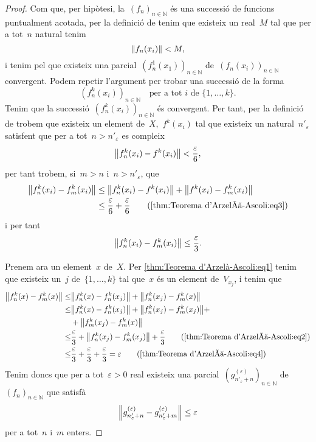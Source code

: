 \documentclass[../../Main.tex]{subfiles}
\begin{document}
\begin{lemma}
\begin{proof}
			Com que, per hipòtesi, la~\((f_{n})_{n\in\mathbb{N}}\) és una successió de funcions puntualment acotada, per la definició de  tenim que existeix un real~\(M\) tal que per a tot~\(n\) natural tenim
			\[
			    \norm{f_{n}(x_{i})}<M,
			\]
			i tenim pel  que existeix una parcial~\((f_{n}^{1}(x_{1}))_{n\in\mathbb{N}}\) de~\((f_{n}(x_{i}))_{n\in\mathbb{N}}\) convergent.
			Podem repetir l'argument per trobar una successió de la forma
			\[
			    (f^{k}_{n}(x_{i}))_{n\in\mathbb{N}}\quad\text{per a tot }i\text{ de }\{1,\dots,k\}.
			\]
			Tenim que la successió~\((f^{k}_{n}(x_{i}))_{n\in\mathbb{N}}\) és convergent.
			Per tant, per la definició de  trobem que existeix un element de~\(X\),~\(f^{k}(x_{i})\) tal que existeix un natural~\(n'_{\varepsilon}\) satisfent que per a tot~\(n>n'_{\varepsilon}\) es compleix
			\begin{equation}
				\label{thm:Teorema d'Arzelà-Ascoli:eq3}
				\norm{f^{k}_{n}(x_{i})-f^{k}(x_{i})}<\frac{\varepsilon}{6},
			\end{equation}
			per tant trobem, si~\(m>n\) i~\(n>n'_{\varepsilon}\), que
			\begin{align*}
				\norm{f^{k}_{n}(x_{i})-f^{k}_{m}(x_{i})}&\leq\norm{f^{k}_{n}(x_{i})-f^{k}(x_{i})}+\norm{f^{k}(x_{i})-f^{k}_{m}(x_{i})} \\
				&\leq\frac{\varepsilon}{6}+\frac{\varepsilon}{6} \tag{\ref{thm:Teorema d'Arzelà-Ascoli:eq3}}
			\end{align*}
			i per tant
			\begin{equation}
				\label{thm:Teorema d'Arzelà-Ascoli:eq4}
				\norm{f^{k}_{n}(x_{i})-f^{k}_{m}(x_{i})}\leq\frac{\varepsilon}{3}.
			\end{equation}

			Prenem ara un element~\(x\) de~\(X\).
			Per \eqref{thm:Teorema d'Arzelà-Ascoli:eq1} tenim que existeix un~\(j\) de~\(\{1,\dots,k\}\) tal que~\(x\) és un element de~\(V_{x_{j}}\), i tenim que
			\begin{align*}
				\norm{f^{k}_{n}(x)-f^{k}_{m}(x)}\leq&\norm{f^{k}_{n}(x)-f^{k}_{n}(x_{j})}+\norm{f^{k}_{n}(x_{j})-f^{k}_{m}(x)} \\
				\leq&\norm{f^{k}_{n}(x)-f^{k}_{n}(x_{j})}+\norm{f^{k}_{n}(x_{j})-f^{k}_{m}(x_{j})}+\\&+\norm{f^{k}_{m}(x_{j})-f^{k}_{m}(x)} \\
				\leq&\frac{\varepsilon}{3}+\norm{f^{k}_{n}(x_{j})-f^{k}_{m}(x_{j})}+\frac{\varepsilon}{3}\tag{\ref{thm:Teorema d'Arzelà-Ascoli:eq2}} \\
				\leq&\frac{\varepsilon}{3}+\frac{\varepsilon}{3}+\frac{\varepsilon}{3}=\varepsilon\tag{\ref{thm:Teorema d'Arzelà-Ascoli:eq4}}
			\end{align*}
			Tenim doncs que per a tot~\(\varepsilon>0\) real existeix una parcial~\((g^{(\varepsilon)}_{n'_{\varepsilon}+n})_{n\in\mathbb{N}}\) de~\((f_{n})_{n\in\mathbb{N}}\) que satisfà
			\[
			    \norm{g^{(\varepsilon)}_{n'_{\varepsilon}+n}-g^{(\varepsilon)}_{n'_{\varepsilon}+m}}\leq\varepsilon
			\]
			per a tot~\(n\) i~\(m\) enters.


\end{proof}
\end{lemma}
\end{document}
